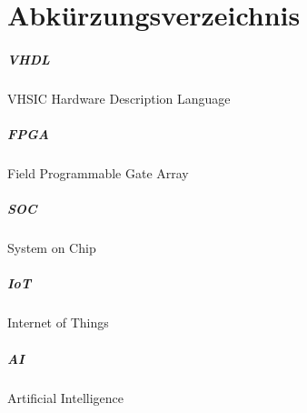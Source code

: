 \chapter*{Abkürzungsverzeichnis}

\paragraph{VHDL} VHSIC Hardware Description Language
\paragraph{FPGA} Field Programmable Gate Array
\paragraph{SOC} System on Chip
\paragraph{IoT} Internet of Things
\paragraph{AI} Artificial Intelligence
